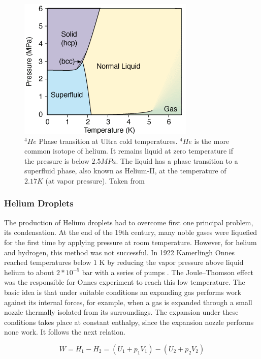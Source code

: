 \begin{figure}[h!]
\centering
\includegraphics[width=8 cm]{../Images/He_temp_phases.png}
\caption[Helium phase diagram]{$^{4}He$ Phase transition at Ultra cold temperatures. $^{4}He$ is the more common isotope of helium. It remains liquid at zero temperature if the pressure is below $2.5 MPa$. The liquid has a phase transition to a superfluid phase, also known as Helium-II, at the temperature of $2.17 K$ (at vapor pressure). Taken from \cite{noauthor_Helium_nodate}}

\end{figure}


\subsubsection{Helium Droplets}

The production of Helium droplets had to overcome first one principal problem, its condensation. At the end  of the 19th century, many noble gases were liquefied for the first time by applying pressure at room temperature. However, for helium and hydrogen, this method was not successful. In 1922 Kamerlingh Onnes reached temperatures below $1$ K by reducing the vapor pressure above liquid helium to about $2*10^{-5}$ bar with a series of pumps \cite{van_delft_discovery_2010}. The Joule–Thomson effect \cite{weinberger_discovery_2013} was the responsible for Onnes experiment to reach this low temperature. The basic idea is that under suitable conditions an expanding gas performs work against its internal forces, for example, when a gas is expanded through a small nozzle thermally isolated from its surroundings. The expansion under these conditions takes place at constant enthalpy, since the expansion nozzle performs none work. It follows the next relation.

\begin{equation}
W= H_{1}-H_{2} = (U_{1}+p_{1}V_{1})-(U_{2}+p_{2}V_{2})
\end{equation}


